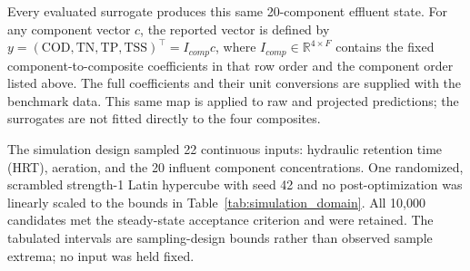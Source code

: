 \documentclass[a4paper,fleqn]{cas-sc}
\begin{document}
Every evaluated surrogate produces this same 20-component effluent state. For any component vector $c$, the reported vector is defined by
$y=(\mathrm{COD},\mathrm{TN},\mathrm{TP},\mathrm{TSS})^\top=I_{comp}c$,
where $I_{comp}\in\mathbb{R}^{4\times F}$ contains the fixed component-to-composite coefficients in that row order and the component order listed above. The full coefficients and their unit conversions are supplied with the benchmark data. This same map is applied to raw and projected predictions; the surrogates are not fitted directly to the four composites.

The simulation design sampled 22 continuous inputs: hydraulic retention time (HRT), aeration, and the 20 influent component concentrations. One randomized, scrambled strength-1 Latin hypercube with seed 42 and no post-optimization was linearly scaled to the bounds in Table~\ref{tab:simulation_domain}. All 10,000 candidates met the steady-state acceptance criterion and were retained. The tabulated intervals are sampling-design bounds rather than observed sample extrema; no input was held fixed.
\end{document}
